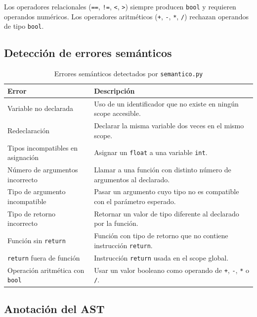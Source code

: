 \documentclass[12pt]{article}
\begin{document}
Los operadores relacionales (\texttt{==}, \texttt{!=}, \texttt{<},
\texttt{>}) siempre producen \texttt{bool} y requieren operandos
numéricos. Los operadores aritméticos (\texttt{+}, \texttt{-},
\texttt{*}, \texttt{/}) rechazan operandos de tipo \texttt{bool}.

\subsection{Detección de errores semánticos}

\begin{table}[H]
\centering
\renewcommand{\arraystretch}{1.2}
\begin{tabular}{@{}p{4.8cm} p{8.2cm}@{}}
\toprule
\textbf{Error} & \textbf{Descripción} \\
\midrule
Variable no declarada
    & Uso de un identificador que no existe en ningún scope
      accesible. \\
Redeclaración
    & Declarar la misma variable dos veces en el mismo scope. \\
Tipos incompatibles en asignación
    & Asignar un \texttt{float} a una variable \texttt{int}. \\
Número de argumentos incorrecto
    & Llamar a una función con distinto número de argumentos
      al declarado. \\
Tipo de argumento incompatible
    & Pasar un argumento cuyo tipo no es compatible con el
      parámetro esperado. \\
Tipo de retorno incorrecto
    & Retornar un valor de tipo diferente al declarado por
      la función. \\
Función sin \texttt{return}
    & Función con tipo de retorno que no contiene instrucción
      \texttt{return}. \\
\texttt{return} fuera de función
    & Instrucción \texttt{return} usada en el scope global. \\
Operación aritmética con \texttt{bool}
    & Usar un valor booleano como operando de \texttt{+},
      \texttt{-}, \texttt{*} o \texttt{/}. \\
\bottomrule
\end{tabular}
\caption{Errores semánticos detectados por \texttt{semantico.py}}
\end{table}

\subsection{Anotación del AST}
\end{document}
